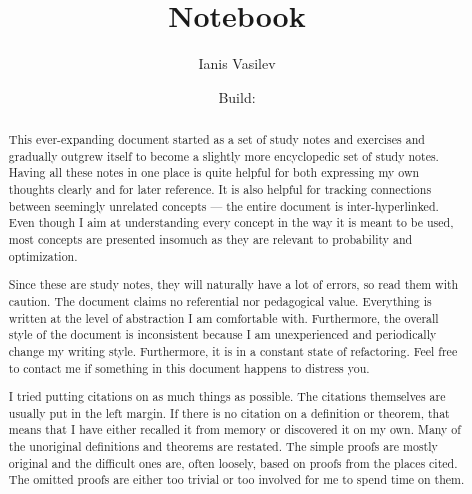 \documentclass[
  headings=standardclasses
  bibliography=totocnumbered
]{scrartcl}
\title{Notebook}
\subtitle{\URL{https://github.com/v--/notebook}}
\author{Ianis Vasilev}
\date{Build: }
\begin{document}
\hfuzz=3.5pt
\reversemarginpar
\maketitle

\begin{abstract}
  This ever-expanding document started as a set of study notes and exercises and gradually outgrew itself to become a slightly more encyclopedic set of study notes. Having all these notes in one place is quite helpful for both expressing my own thoughts clearly and for later reference. It is also helpful for tracking connections between seemingly unrelated concepts --- the entire document is inter-hyperlinked. Even though I aim at understanding every concept in the way it is meant to be used, most concepts are presented insomuch as they are relevant to probability and optimization.

  Since these are study notes, they will naturally have a lot of errors, so read them with caution. The document claims no referential nor pedagogical value. Everything is written at the level of abstraction I am comfortable with. Furthermore, the overall style of the document is inconsistent because I am unexperienced and periodically change my writing style. Furthermore, it is in a constant state of refactoring. Feel free to contact me if something in this document happens to distress you.

  I tried putting citations on as much things as possible. The citations themselves are usually put in the left margin. If there is no citation on a definition or theorem, that means that I have either recalled it from memory or discovered it on my own. Many of the unoriginal definitions and theorems are restated. The simple proofs are mostly original and the difficult ones are, often loosely, based on proofs from the places cited. The omitted proofs are either too trivial or too involved for me to spend time on them.
\end{abstract}

\newpage
{}
\tableofcontents
\newpage















\end{document}
